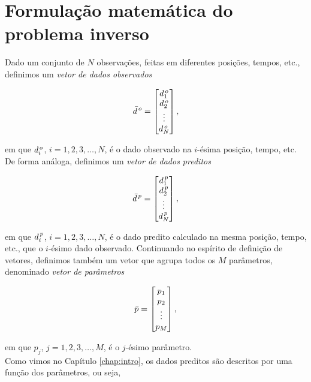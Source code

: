 \chapter{Formulação matemática do problema inverso}

Dado um conjunto de $N$ observações, feitas em diferentes posições, tempos, etc.,
de\-fi\-ni\-mos um {\it vetor de dados observados}

\begin{equation}
\bar{d}^{\thinspace o} =
    \begin{bmatrix}
    d_1^{\thinspace o} \\
    d_2^{\thinspace o} \\
    \vdots \\
    d_N^{\thinspace o}
    \end{bmatrix},
\end{equation}

\noindent em que $d_i^{\thinspace o}$, $i = 1, 2, 3, \dotsc, N$, é o dado
observado na $i$-ésima posição, tempo, etc.
De forma análoga, definimos um {\it vetor de dados preditos}

\begin{equation}
\bar{d}^{\thinspace p} =
    \begin{bmatrix}
    d_1^{\thinspace p} \\
    d_2^{\thinspace p} \\
    \vdots \\
    d_N^{\thinspace p}
    \end{bmatrix},
\end{equation}

\noindent em que $d_i^{\thinspace p}$, $i = 1, 2, 3, \dotsc, N$, é o dado predito
calculado na mesma posição, tempo, etc., que o $i$-ésimo dado observado.
Continuando no espírito de definição de vetores, definimos também um vetor que
agrupa todos os $M$ parâmetros, denominado {\it vetor de parâmetros}

\begin{equation}
\bar{p} =
    \begin{bmatrix}
    p_1 \\
    p_2 \\
    \vdots \\
    p_M
    \end{bmatrix},
\end{equation}

\noindent em que $p_j$, $j = 1, 2, 3, \dotsc, M$, é o $j$-ésimo parâmetro.
\\
\indent Como vimos no Capítulo \ref{chap:intro}, os dados preditos são descritos
por uma função dos parâmetros, ou seja,

